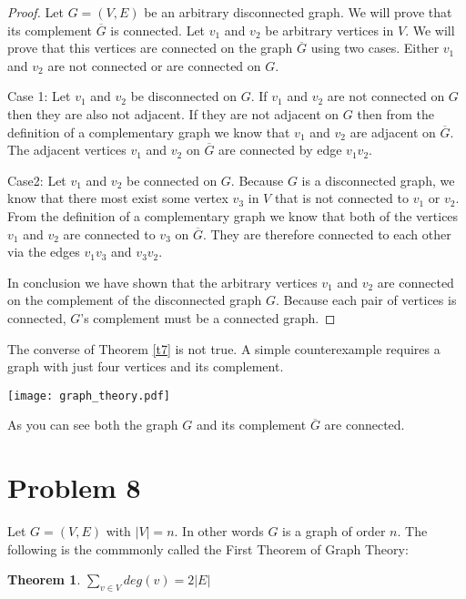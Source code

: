 \documentclass{article}
\newtheorem{thm}{Theorem}
\begin{document}
\begin{proof}
Let $G=(V,E)$ be an arbitrary disconnected graph. We will prove that its complement $\overline G$ is connected. Let $v_1$ and $v_2$ be arbitrary vertices in $V$. We will prove that this vertices are connected on the graph $\overline G$ using two cases. Either $v_1$ and $v_2$ are not connected or are connected on $G$.

Case 1: Let $v_1$ and $v_2$ be disconnected on $G$. If $v_1$ and $v_2$ are not connected on $G$ then they are also not adjacent. If they are not adjacent on $G$ then from the definition of a complementary graph we know that $v_1$ and $v_2$ are adjacent on $\overline G$. The adjacent vertices $v_1$ and $v_2$ on $\overline G$ are connected by edge $v_1v_2$.

Case2: Let $v_1$ and $v_2$ be connected on $G$. Because $G$ is a disconnected graph, we know that there most exist some vertex $v_3$ in $V$ that is not connected to $v_1$ or $v_2$. From the definition of a complementary graph we know that both of the vertices $v_1$ and $v_2$ are connected to $v_3$ on $\overline G$. They are therefore connected to each other via the edges $v_1v_3$ and $v_3v_2$.

In conclusion we have shown that the arbitrary vertices $v_1$ and $v_2$ are connected on the complement of the disconnected graph $G$. Because each pair of vertices is connected, $G$'s complement must be a connected graph.
\end{proof}

The converse of Theorem \ref{t7} is not true. A simple counterexample requires a graph with just four vertices and its complement.

\begin{center}
\texttt{[image: graph\_theory.pdf]}
\end{center}

As you can see both the graph $G$ and its complement $\overline G$ are connected.

\section*{Problem 8}
Let $G=(V,E)$ with $|V| = n$. In other words $G$ is a graph of order $n$. The following is the commmonly called the First Theorem of Graph Theory:
\begin{thm}
$\displaystyle \sum\limits_{v\in V} deg(v) = 2|E| $
\end{thm}
\end{document}
